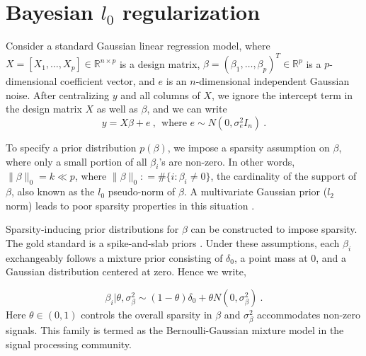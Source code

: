 \documentclass[11pt]{article}%
\numberwithin{equation}{section}
\theoremstyle{plain}
\newcommand{\defeq}{\mathrel{\mathop:}=}
\begin{document}
\section{Bayesian $l_0$ regularization \label{s&s}}

Consider a standard Gaussian linear regression model, where $X = [X_1, \ldots, X_p]\in \mathbb{R}^{n \times p}$ is a design matrix, $\beta = (\beta_1, \ldots, \beta_p)^T\in\mathbb{R}^p$ is a $p$-dimensional coefficient vector, and $e$ is an $n$-dimensional independent Gaussian noise.  After centralizing $y$ and all columns of $X$, we ignore the intercept term in the design matrix $X$ as well as $\beta$, and we can write
\begin{equation}
\label{eqn:linreg}
y = X\beta + e \ , \ \  \text{where } e \sim N(0, \sigma_e^2I_n) \ .
\end{equation}

To specify a prior distribution $p\left(\beta\right)$, we impose a sparsity assumption on $\beta$, where only a small portion of all $\beta_i$'s are non-zero.  In other words, $\|\beta\|_0 = k \ll p$, where $\|\beta\|_0 \defeq \#\{i : \beta_i\neq0\}$, the cardinality of the support of $\beta$, also known as the $l_0$ pseudo-norm of $\beta$.  A multivariate Gaussian prior ($l_2$ norm) leads to poor sparsity properties in this situation \citep[see, e.g.,][]{polson2010shrink}.

Sparsity-inducing prior distributions for $\beta$ can be constructed to impose sparsity.  The gold standard is a spike-and-slab priors \citep{jeffreys1961,mitchell1988,george1993}. Under these assumptions, each $\beta_i$ exchangeably follows a mixture prior consisting of $\delta_0$, a point mass at $0$, and a Gaussian distribution centered at zero. Hence we write,

\begin{equation}
\label{eqn:ss}
\beta_i | \theta, \sigma_\beta^2 \sim (1-\theta)\delta_0 + \theta N\left(0, \sigma_\beta^2\right) \ .
\end{equation}
Here $\theta\in \left(0, 1\right)$ controls the overall sparsity in $\beta$ and $\sigma_\beta^2$ accommodates non-zero signals.  This family is termed as the Bernoulli-Gaussian mixture model in the signal processing community.
\end{document}
